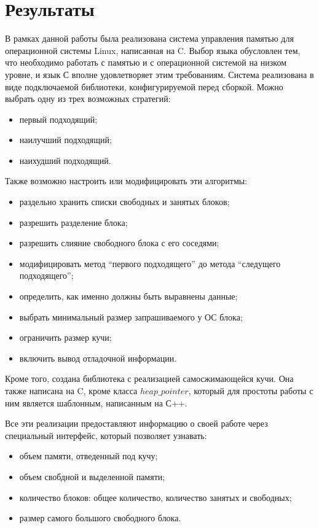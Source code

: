 \documentclass[12pt,a4paper]{article}
\begin{document}
\section{Результаты}
В рамках данной работы была реализована система управления памятью для операционной 
системы Linux, написанная на C. Выбор языка обусловлен тем, что необходимо работать с памятью и 
с операционной системой на низком уровне, и язык С вполне удовлетворяет этим требованиям.
Система реализована в виде подключаемой библиотеки,
конфигурируемой перед сборкой. Можно выбрать одну из трех возможных стратегий:
\begin{itemize}
\item первый подходящий;
\item наилучший подходящий;
\item наихудший подходящий.
\end{itemize}
Также возможно настроить или модифицировать эти алгоритмы:
\begin{itemize}
\item раздельно хранить списки свободных и занятых блоков;
\item разрешить разделение блока;
\item разрешить слияние свободного блока с его соседями;
\item модифицировать метод ``первого подходящего'' до метода ``следущего подходящего'';
\item определить, как именно должны быть выравнены данные;
\item выбрать минимальный размер запрашиваемого у ОС блока;
\item ограничить размер кучи;
\item включить вывод отладочной информации.
\end{itemize}

Кроме того, создана библиотека с реализацией самосжимающейся кучи. Она также написана на C,
кроме класса $heap\_pointer$, который для простоты работы с ним является шаблонным,
написанным на С++. 

Все эти реализации предоставляют информацию о своей работе через специальный интерфейс,
который позволяет узнавать:
\begin{itemize}
\item объем памяти, отведенный под кучу;
\item объем свобдной и выделенной памяти;
\item количество блоков: общее количество, количество занятых и свободных;
\item размер самого большого свободного блока.
\end{itemize}
\end{document}
